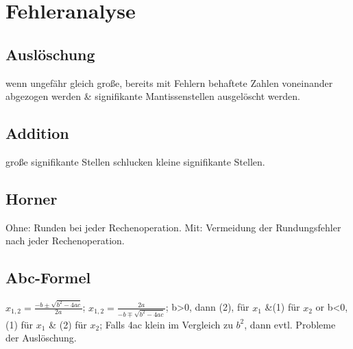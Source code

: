 \section{Fehleranalyse}
\subsection{Auslöschung}
wenn ungefähr gleich große, bereits mit Fehlern behaftete Zahlen voneinander abgezogen werden \& signifikante Mantissenstellen ausgelöscht werden.
\subsection{Addition}
große signifikante Stellen schlucken kleine signifikante Stellen.
\subsection{Horner}
Ohne: Runden bei jeder Rechenoperation. Mit: Vermeidung der Rundungsfehler nach jeder Rechenoperation.
\subsection{Abc-Formel}
$ x_{1,2} = \frac{-b \pm \sqrt{b^2 - 4ac}}{2a} $; 
$ x_{1,2} = \frac{2a}{-b \mp \sqrt{b^2 -4ac}} $; 
b>0, dann (2), für $ x_1 $ \&(1) für $ x_2 $ or 
b<0, (1) für $x_{1} $ \& (2) für $ x_2 $;
Falls 4ac klein im Vergleich zu $ b^2$, dann evtl. Probleme der Auslöschung.